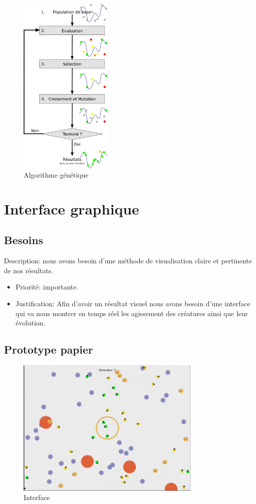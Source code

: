 \begin{figure}[H]
    \centering
    \includegraphics[width=0.4\textwidth]{./pictures/algorithme_genetique.png}
    \caption{Algorithme génétique}
\end{figure}


\section{Interface graphique}
\subsection{Besoins}
Description: nous avons besoin d'une méthode de visualisation claire et pertinente de nos résultats.
\begin{itemize}
 \item Priorité: importante.
 \item Justification: Afin d’avoir un résultat visuel nous avons besoin d’une interface qui va nous 
montrer en temps réel les agissement des créatures ainsi que leur évolution.\\
\end{itemize}


\subsection{Prototype papier}
\begin{figure}[H]
    \centering
    \includegraphics[width=0.8\textwidth]{./pictures/prototype.png}
    \caption{Interface}
\end{figure}


\clearpage
